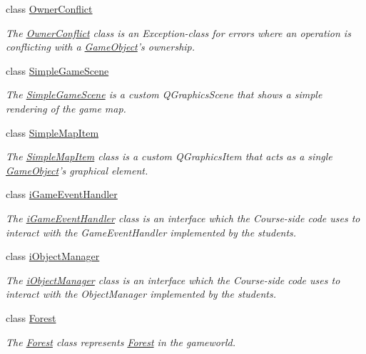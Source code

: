 \begin{DoxyCompactItemize}
class \hyperlink{classCourse_1_1OwnerConflict}{Owner\-Conflict}
\begin{DoxyCompactList}\small\item\em The \hyperlink{classCourse_1_1OwnerConflict}{Owner\-Conflict} class is an Exception-\/class for errors where an operation is conflicting with a \hyperlink{classCourse_1_1GameObject}{Game\-Object}'s ownership. \end{DoxyCompactList}\item 
class \hyperlink{classCourse_1_1SimpleGameScene}{Simple\-Game\-Scene}
\begin{DoxyCompactList}\small\item\em The \hyperlink{classCourse_1_1SimpleGameScene}{Simple\-Game\-Scene} is a custom Q\-Graphics\-Scene that shows a simple rendering of the game map. \end{DoxyCompactList}\item 
class \hyperlink{classCourse_1_1SimpleMapItem}{Simple\-Map\-Item}
\begin{DoxyCompactList}\small\item\em The \hyperlink{classCourse_1_1SimpleMapItem}{Simple\-Map\-Item} class is a custom Q\-Graphics\-Item that acts as a single \hyperlink{classCourse_1_1GameObject}{Game\-Object}'s graphical element. \end{DoxyCompactList}\item 
class \hyperlink{classCourse_1_1iGameEventHandler}{i\-Game\-Event\-Handler}
\begin{DoxyCompactList}\small\item\em The \hyperlink{classCourse_1_1iGameEventHandler}{i\-Game\-Event\-Handler} class is an interface which the Course-\/side code uses to interact with the Game\-Event\-Handler implemented by the students. \end{DoxyCompactList}\item 
class \hyperlink{classCourse_1_1iObjectManager}{i\-Object\-Manager}
\begin{DoxyCompactList}\small\item\em The \hyperlink{classCourse_1_1iObjectManager}{i\-Object\-Manager} class is an interface which the Course-\/side code uses to interact with the Object\-Manager implemented by the students. \end{DoxyCompactList}\item 
class \hyperlink{classCourse_1_1Forest}{Forest}
\begin{DoxyCompactList}\small\item\em The \hyperlink{classCourse_1_1Forest}{Forest} class represents \hyperlink{classCourse_1_1Forest}{Forest} in the gameworld. \end{DoxyCompactList}\item 

\end{DoxyCompactItemize}
